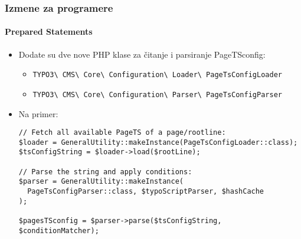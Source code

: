 
\begin{frame}[fragile]
	\frametitle{Izmene za programere}
	\framesubtitle{Prepared Statements}

	\lstset{basicstyle=\tiny\ttfamily}

	\begin{itemize}
		\item Dodate su dve nove PHP klase za čitanje i parsiranje PageTSconfig:
			\begin{itemize}\smaller
				\item \texttt{TYPO3\textbackslash
					CMS\textbackslash
					Core\textbackslash
					Configuration\textbackslash
					Loader\textbackslash
					PageTsConfigLoader}
				\item \texttt{TYPO3\textbackslash
					CMS\textbackslash
					Core\textbackslash
					Configuration\textbackslash
					Parser\textbackslash
					PageTsConfigParser}
			\end{itemize}

		\item Na primer:
\begin{lstlisting}
// Fetch all available PageTS of a page/rootline:
$loader = GeneralUtility::makeInstance(PageTsConfigLoader::class);
$tsConfigString = $loader->load($rootLine);

// Parse the string and apply conditions:
$parser = GeneralUtility::makeInstance(
  PageTsConfigParser::class, $typoScriptParser, $hashCache
);

$pagesTSconfig = $parser->parse($tsConfigString, $conditionMatcher);
\end{lstlisting}

	\end{itemize}

\end{frame}


